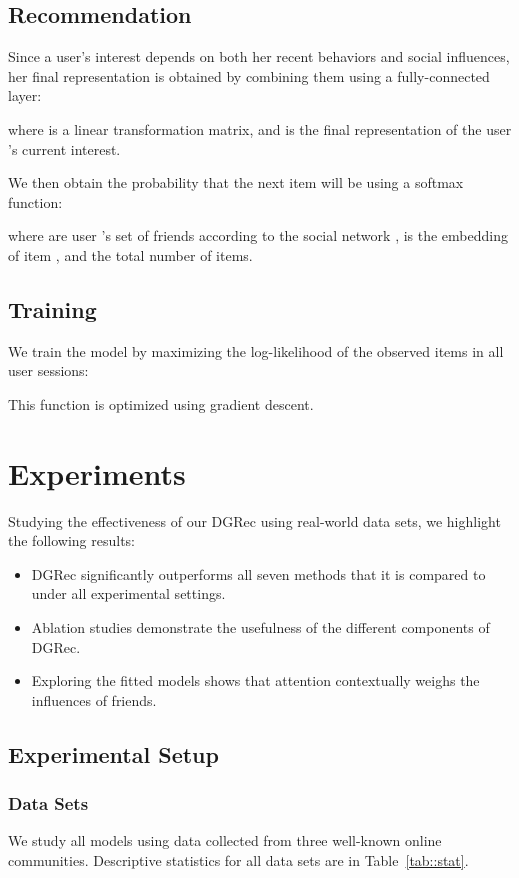 \documentclass[sigconf]{acmart}
\begin{document}
\subsection{Recommendation}\label{sec:recommendation}
Since a user's interest depends on both her recent behaviors and social influences, her final representation is obtained by combining them using a fully-connected layer:

where  is a linear transformation matrix, and  is the final representation of the user 's current interest. 

We then obtain the probability that the next item will be  using a softmax function:

where  are user 's set of friends according to the social network ,  is the embedding of item , and  the total number of items.

\subsection{Training}
We train the model by maximizing the log-likelihood of the observed items in all user sessions:

This function is optimized using gradient descent.  \section{Experiments}
Studying the effectiveness of our \gls{DGRec} using real-world data sets, we highlight the following results: 
\begin{itemize}
\item \gls{DGRec} significantly outperforms all seven methods that it is compared to under all experimental settings.
\item Ablation studies demonstrate the usefulness of the different components of \gls{DGRec}.
\item Exploring the fitted models shows that attention contextually weighs the influences of friends.
\end{itemize}
\subsection{Experimental Setup}
\subsubsection{Data Sets}
We study all models using data collected from three well-known online communities. Descriptive statistics for all data sets are in Table~\ref{tab::stat}.
\end{document}
